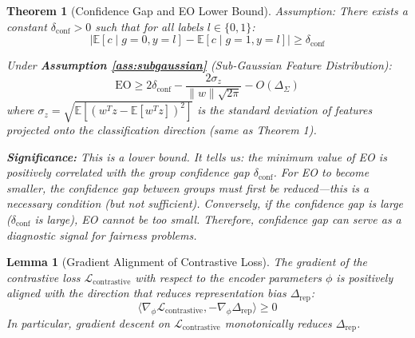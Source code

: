 \documentclass[11pt]{article}
\newtheorem{theorem}{Theorem}
\newtheorem{lemma}{Lemma}
\begin{document}
\begin{theorem}[Confidence Gap and EO Lower Bound]
\label{thm:conf_eo}
\textit{Assumption}: There exists a constant $\delta_{\mathrm{conf}} > 0$ such that for all labels $l \in \{0,1\}$:
$$\left| \mathbb{E}[c \mid g=0, y=l] - \mathbb{E}[c \mid g=1, y=l] \right| \geq \delta_{\mathrm{conf}}$$

Under \textbf{Assumption \ref{ass:subgaussian}} (Sub-Gaussian Feature Distribution):
$$\mathrm{EO} \geq 2\delta_{\mathrm{conf}} - \frac{2\sigma_z}{\|w\|\sqrt{2\pi}} - O(\Delta_{\Sigma})$$
where $\sigma_z = \sqrt{\mathbb{E}\left[(w^T z - \mathbb{E}[w^T z])^2\right]}$ is the standard deviation of features projected onto the classification direction (same as Theorem 1).

\textbf{Significance:} This is a \textit{lower bound}. It tells us: the minimum value of EO is positively correlated with the group confidence gap $\delta_{\mathrm{conf}}$. For EO to become smaller, the confidence gap between groups must first be reduced---this is a necessary condition (but not sufficient). Conversely, if the confidence gap is large ($\delta_{\mathrm{conf}}$ is large), EO cannot be too small. Therefore, confidence gap can serve as a diagnostic signal for fairness problems.
\end{theorem}

\begin{lemma}[Gradient Alignment of Contrastive Loss]
\label{lem:grad_alignment}
The gradient of the contrastive loss $\mathcal{L}_{\mathrm{contrastive}}$ with respect to the encoder parameters $\phi$ is positively aligned with the direction that reduces representation bias $\Delta_{\mathrm{rep}}$:
$$\langle \nabla_\phi \mathcal{L}_{\mathrm{contrastive}}, -\nabla_\phi \Delta_{\mathrm{rep}} \rangle \geq 0$$
In particular, gradient descent on $\mathcal{L}_{\mathrm{contrastive}}$ monotonically reduces $\Delta_{\mathrm{rep}}$.
\end{lemma}
\end{document}
